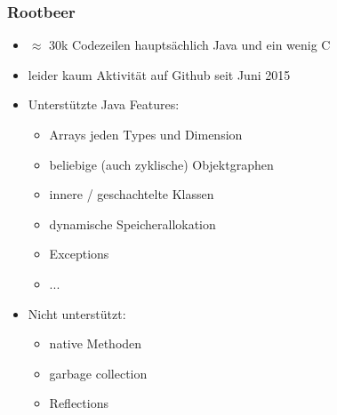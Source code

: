 \begin{frame}
    \frametitle{Rootbeer}
    \begin{itemize}
        \item $\approx$ 30k Codezeilen hauptsächlich Java und ein wenig C %
        \item leider kaum Aktivität auf Github seit Juni 2015 %
        \item Unterstützte Java Features:
        \begin{itemize}
            \item Arrays jeden Types und Dimension
            \item beliebige (auch zyklische) Objektgraphen
            \item innere / geschachtelte Klassen
            \item dynamische Speicherallokation
            \item Exceptions
            \item ...
        \end{itemize}
        \item Nicht unterstützt:
        \begin{itemize}
            \item native Methoden %
            \item garbage collection
            \item Reflections
        \end{itemize}
    \end{itemize}
\end{frame}


